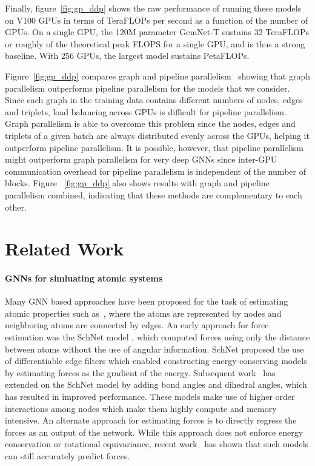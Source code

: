 \documentclass{article} \usepackage{iclr2022_conference,times}
\begin{document}
Finally, figure~\ref{fig:gp_ddp} shows the raw performance of running these models on V100 GPUs in terms of TeraFLOPs per second as a function of the number of GPUs. On a single GPU, the 120M parameter GemNet-T sustains 32 TeraFLOPs or roughly  of the theoretical peak FLOPS for a single GPU, and is thus a strong baseline. With 256 GPUs, the largest model sustains  PetaFLOPs.

Figure~\ref{fig:gp_ddp} compares graph and pipeline parallelism~\citep{huang2019gpipe} showing that graph parallelism outperforms pipeline parallelism for the models that we consider. Since each graph in the training data contains different numbers of nodes, edges and triplets, load balancing across GPUs is difficult for pipeline parallelism. Graph parallelism is able to overcome this problem since the nodes, edges and triplets of a given batch are always distributed evenly across the GPUs, helping it outperform pipeline parallelism.
It is possible, however, that pipeline parallelism might outperform graph parallelism for very deep GNNs since inter-GPU communication overhead for pipeline parallelism is independent of the number of blocks.
Figure ~\ref{fig:gp_ddp} also shows results with graph and pipeline parallelism combined,
indicating that these methods are complementary to each other.











\section{Related Work}
\label{sec:related}

\paragraph{GNNs for simluating atomic systems}
Many GNN based approaches have been proposed for the task of estimating atomic properties such as~\citep{schutt2017quantum,gilmer2017neural,jorgensen2018neural,schutt2017schnet,schutt2018schnet,xie2018crystal,qiao2020orbnet,klicpera2020directional}, where the atoms are represented by nodes and neighboring atoms are connected by edges. An early approach for force estimation was the SchNet model \cite{schutt2017schnet}, which computed forces using only the distance between atoms without the use of angular information. SchNet proposed the use of differentiable edge filters which enabled constructing energy-conserving models by estimating forces as the gradient of the energy.
Subsequent work~\citep{klicpera_dimenetpp_2020,klicpera2020directional,klicpera2021gemnet,liu2021spherical} has extended on the SchNet model by adding bond angles and dihedral angles, which has resulted in improved performance. These models make use of higher order interactions among nodes which make them highly compute and memory intensive. An alternate approach for estimating forces is to directly regress the forces as an output of the network. While this approach does not enforce energy conservation or rotational equivariance, recent work~\citep{hu2021forcenet} has shown that such models can still accurately predict forces.
\end{document}

